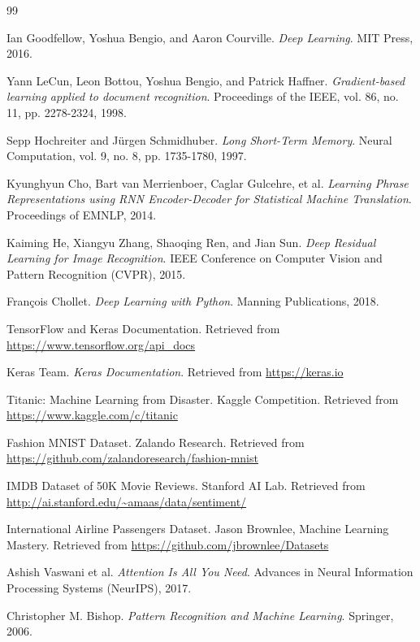 \documentclass[12pt, a4paper]{article}
\begin{document}
\begin{thebibliography}{99}

Ian Goodfellow, Yoshua Bengio, and Aaron Courville. 
\textit{Deep Learning}. 
MIT Press, 2016.

Yann LeCun, Leon Bottou, Yoshua Bengio, and Patrick Haffner. 
\textit{Gradient-based learning applied to document recognition}. 
Proceedings of the IEEE, vol. 86, no. 11, pp. 2278-2324, 1998.

Sepp Hochreiter and Jürgen Schmidhuber. 
\textit{Long Short-Term Memory}. 
Neural Computation, vol. 9, no. 8, pp. 1735-1780, 1997.

Kyunghyun Cho, Bart van Merrienboer, Caglar Gulcehre, et al. 
\textit{Learning Phrase Representations using RNN Encoder-Decoder for Statistical Machine Translation}. 
Proceedings of EMNLP, 2014.

Kaiming He, Xiangyu Zhang, Shaoqing Ren, and Jian Sun.
\textit{Deep Residual Learning for Image Recognition}.
IEEE Conference on Computer Vision and Pattern Recognition (CVPR), 2015.

François Chollet. 
\textit{Deep Learning with Python}. 
Manning Publications, 2018.

TensorFlow and Keras Documentation. 
Retrieved from \url{https://www.tensorflow.org/api_docs}

Keras Team.
\textit{Keras Documentation}.
Retrieved from \url{https://keras.io}

Titanic: Machine Learning from Disaster. 
Kaggle Competition.
Retrieved from \url{https://www.kaggle.com/c/titanic}

Fashion MNIST Dataset. 
Zalando Research.
Retrieved from \url{https://github.com/zalandoresearch/fashion-mnist}

IMDB Dataset of 50K Movie Reviews. 
Stanford AI Lab.
Retrieved from \url{http://ai.stanford.edu/~amaas/data/sentiment/}

International Airline Passengers Dataset. 
Jason Brownlee, Machine Learning Mastery.
Retrieved from \url{https://github.com/jbrownlee/Datasets}

Ashish Vaswani et al.
\textit{Attention Is All You Need}.
Advances in Neural Information Processing Systems (NeurIPS), 2017.

Christopher M. Bishop.
\textit{Pattern Recognition and Machine Learning}.
Springer, 2006.

\end{thebibliography}
\end{document}
